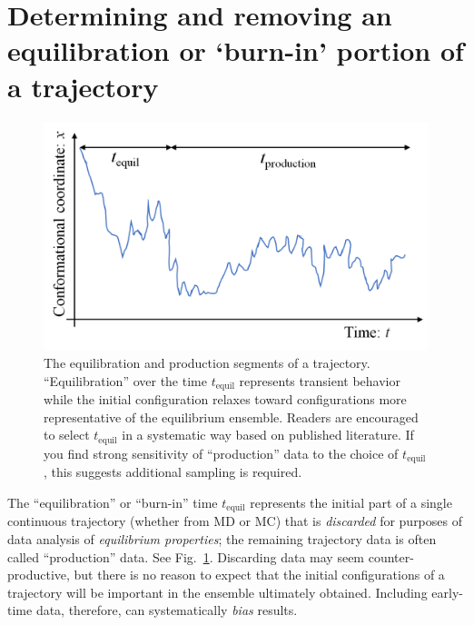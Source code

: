
\section{Determining and removing an equilibration or `burn-in' portion of a trajectory}
\label{sec:equil}

\begin{figure}
  \centering
  \includegraphics[width=0.9\linewidth]{figures/tequil-time-trace}
  \caption{
  \label{fig:tequil}
  The equilibration and production segments of a trajectory.
  ``Equilibration'' over the time $t_{\mathrm{equil}}$ represents transient behavior while the initial configuration relaxes toward configurations more representative of the equilibrium ensemble.
  Readers are encouraged to select $t_{\mathrm{equil}}$ in a systematic way based on published literature.
  If you find strong sensitivity of ``production'' data to the choice of $t_{\mathrm{equil}}$, this suggests additional sampling is required.
  }
\end{figure}

The ``equilibration'' or ``burn-in'' time $t_{\mathrm{equil}}$ represents the initial part of a single continuous trajectory (whether from MD or MC) that is \emph{discarded} for purposes of data analysis of \emph{equilibrium properties};
the remaining trajectory data is often called ``production'' data.
See Fig.\ \ref{fig:tequil}.
Discarding data may seem counter-productive, but there is no reason to expect that the initial configurations of a trajectory will be important in the ensemble ultimately obtained.
Including early-time data, therefore, can systematically \emph{bias} results.


